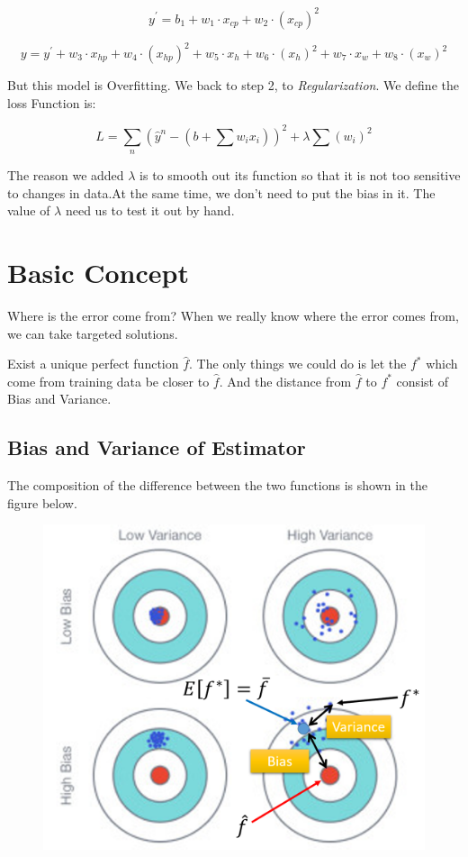 \documentclass{article}
\begin{document}
\begin{enumerate}
    $$
    y^{\prime}=b_{1}+w_{1} \cdot x_{c p}+w_{2} \cdot\left(x_{c p}\right)^{2}
    $$

    $$
    y=y^{\prime}+w_{3} \cdot x_{h p}+w_{4} \cdot\left(x_{h p}\right)^{2}+w_{5} \cdot x_{h}+w_{6} \cdot\left(x_{h}\right)^{2}+w_{7} \cdot x_{w}+w_{8} \cdot\left(x_{w}\right)^{2}
    $$

    But this model is Overfitting. We back to step 2, to \textit{Regularization}. We define the loss Function is:

    $$
    L=\sum_{n}\left(\hat{y}^{n}-\left(b+\sum w_{i} x_{i}\right)\right)^{2}+\lambda \sum\left(w_{i}\right)^{2}
    $$

    The reason we added $\lambda$ is to smooth out its function so that it is not too sensitive to changes in data.At the same time, we don't need to put the bias in it. The value of $\lambda$ need us to test it out by hand.
\end{enumerate}

\section{Basic Concept}

Where is the error come from? When we really know where the error comes from, we can take targeted solutions.

Exist a unique perfect function $\hat f$. The only things we could do is let the $f^*$ which come from training data be closer to $\hat f$. And the distance from $\hat f$ to $f^*$ consist of Bias and Variance.

\subsection{Bias and Variance of Estimator}

The composition of the difference between the two functions is shown in the figure below.

\begin{figure}[htbp]
  \centering
  \includegraphics[scale=0.6]{pic/difference.png}
  \label{fig:my_label}
\end{figure}
\end{document}
